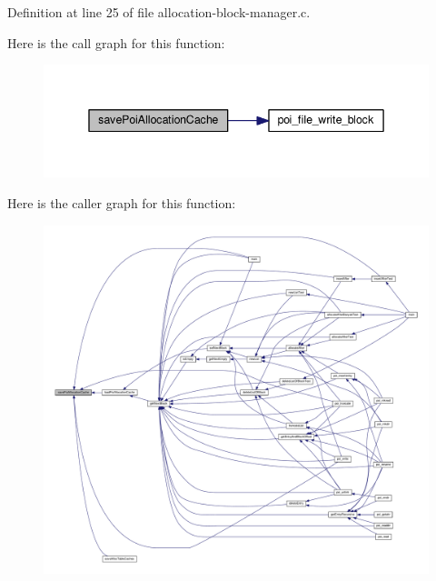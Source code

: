 Definition at line 25 of file allocation-\/block-\/manager.\-c.



Here is the call graph for this function\-:
\nopagebreak
\begin{figure}[H]
\begin{center}
\leavevmode
\includegraphics[width=342pt]{allocation-block-manager_8h_aa62c7923af0be489b52b1dcdd7c04e23_cgraph}
\end{center}
\end{figure}




Here is the caller graph for this function\-:
\nopagebreak
\begin{figure}[H]
\begin{center}
\leavevmode
\includegraphics[width=350pt]{allocation-block-manager_8h_aa62c7923af0be489b52b1dcdd7c04e23_icgraph}
\end{center}
\end{figure}


